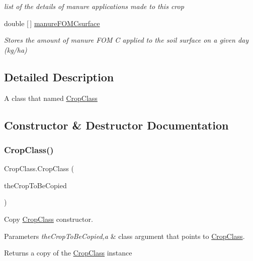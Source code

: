 \begin{DoxyCompactItemize}
\begin{DoxyCompactList}\small\item\em list of the details of manure applications made to this crop \end{DoxyCompactList}\item 
\mbox{\label{class_crop_class_a5d9c59d163042fa681af5bf114320b7e}} 
double \mbox{[}$\,$\mbox{]} \mbox{\hyperlink{class_crop_class_a5d9c59d163042fa681af5bf114320b7e}{manure\+F\+O\+M\+Csurface}}
\begin{DoxyCompactList}\small\item\em Stores the amount of manure F\+OM C applied to the soil surface on a given day (kg/ha) \end{DoxyCompactList}\end{DoxyCompactItemize}


\subsection{Detailed Description}
A class that named \mbox{\hyperlink{class_crop_class}{Crop\+Class}} 

\subsection{Constructor \& Destructor Documentation}
\mbox{\label{class_crop_class_a8e00519cb09b767e943f60c4255c7474}} 
\subsubsection{\texorpdfstring{CropClass()}{CropClass()}\hspace{0.1cm}{\footnotesize\ttfamily [1/2]}}
{\footnotesize\ttfamily Crop\+Class.\+Crop\+Class (\begin{DoxyParamCaption}\item[{\mbox{\hyperlink{class_crop_class}{Crop\+Class}}}]{the\+Crop\+To\+Be\+Copied }\end{DoxyParamCaption})\hspace{0.3cm}{\ttfamily [inline]}}



Copy \mbox{\hyperlink{class_crop_class}{Crop\+Class}} constructor. 


\begin{DoxyParams}{Parameters}
{\em the\+Crop\+To\+Be\+Copied,a} & class argument that points to \mbox{\hyperlink{class_crop_class}{Crop\+Class}}. \\
\hline
\end{DoxyParams}
\begin{DoxyReturn}{Returns}
a copy of the \mbox{\hyperlink{class_crop_class}{Crop\+Class}} instance 
\end{DoxyReturn}
\mbox{\label{class_crop_class_a1f02ef403977ce1a660de90ec3347d2f}} 
